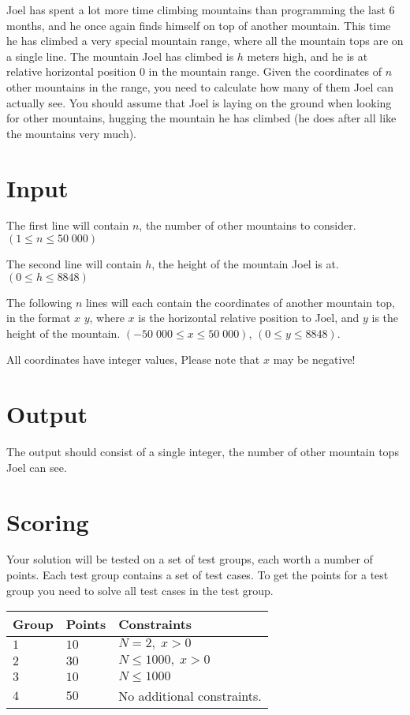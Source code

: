 \noindent

Joel has spent a lot more time climbing mountains than programming the last 6 months, and he once again finds himself on top of another mountain.
This time he has climbed a very special mountain range, where all the mountain tops are on a single line. 
The mountain Joel has climbed is $h$ meters high, and he is at relative horizontal position 0 in the mountain range.
Given the coordinates of $n$ other mountains in the range, you need to calculate how many of them Joel can actually see.
You should assume that Joel is laying on the ground when looking for other mountains, hugging the mountain he has climbed (he does after all like the mountains very much).

\section*{Input}
The first line will contain $n$, the number of other mountains to consider. $(1 \leq n \leq 50\;000)$

The second line will contain $h$, the height of the mountain Joel is at. $(0 \leq h \leq 8848)$

The following $n$ lines will each contain the coordinates of another mountain top, in the format $x$ $y$, where $x$ is the horizontal relative position to Joel,
and $y$ is the height of the mountain. $(-50\;000 \leq x \leq 50\;000)$, $(0 \leq y \leq 8848)$.

All coordinates have integer values, Please note that $x$ may be negative!

\section*{Output}
The output should consist of a single integer, the number of other mountain tops Joel can see.

\section*{Scoring}
Your solution will be tested on a set of test groups, each worth a number of points. Each test group contains
a set of test cases. To get the points for a test group you need to solve all test cases in the test group.

\noindent
\begin{tabular}{| l | l | p{12cm} |}
  \hline
  \textbf{Group} & \textbf{Points} & \textbf{Constraints} \\ \hline
  $1$    & $10$       & $N = 2,\;x > 0$ \\ \hline
  $2$    & $30$       & $N \leq 1000,\;x > 0$ \\ \hline
  $3$    & $10$       & $N \leq 1000$ \\ \hline
  $4$    & $50$       & No additional constraints. \\ \hline
\end{tabular}

